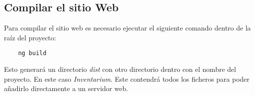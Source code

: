 \subsection{Compilar el sitio Web}
Para compilar el sitio web es necesario ejecutar el siguiente comando dentro de la raíz del proyecto:
\begin{verbatim}
    ng build
\end{verbatim}
Esto generará un directorio \textit{dist} con otro directorio dentro con el nombre del proyecto. En este caso \textit{Inventarium}. Este contendrá todos los ficheros para poder añadirlo directamente a un servidor web.
